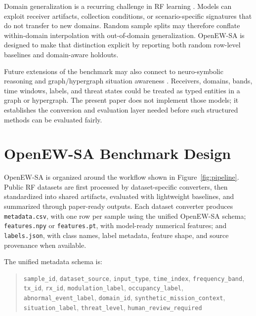 \documentclass[11pt]{article}
\newcommand{\artifact}[1]{\texttt{#1}}
\begin{document}
Domain generalization is a recurring challenge in RF learning \cite{zhang2025domainGeneralizationRff}. Models can exploit receiver artifacts, collection conditions, or scenario-specific signatures that do not transfer to new domains. Random sample splits may therefore conflate within-domain interpolation with out-of-domain generalization. OpenEW-SA is designed to make that distinction explicit by reporting both random row-level baselines and domain-aware holdouts.

Future extensions of the benchmark may also connect to neuro-symbolic reasoning \cite{cheng2024neuralSymbolicKgSurvey,liu2025neuralSymbolicQuerySurvey,delong2023neurosymbolicAiKgSurvey} and graph/hypergraph situation awareness \cite{gao2024hypergraphSituationAwareness,alavizadeh2022cyberSituationAwarenessSurvey}. Receivers, domains, bands, time windows, labels, and threat states could be treated as typed entities in a graph or hypergraph. The present paper does not implement those models; it establishes the conversion and evaluation layer needed before such structured methods can be evaluated fairly.

\section{OpenEW-SA Benchmark Design}

OpenEW-SA is organized around the workflow shown in Figure~\ref{fig:pipeline}. Public RF datasets are first processed by dataset-specific converters, then standardized into shared artifacts, evaluated with lightweight baselines, and summarized through paper-ready outputs. Each dataset converter produces \artifact{metadata.csv}, with one row per sample using the unified OpenEW-SA schema; \artifact{features.npy} or \artifact{features.pt}, with model-ready numerical features; and \artifact{labels.json}, with class names, label metadata, feature shape, and source provenance when available.

The unified metadata schema is:
\begin{quote}\small
\artifact{sample\_id}, \artifact{dataset\_source}, \artifact{input\_type}, \artifact{time\_index}, \artifact{frequency\_band}, \artifact{tx\_id}, \artifact{rx\_id}, \artifact{modulation\_label}, \artifact{occupancy\_label}, \artifact{abnormal\_event\_label}, \artifact{domain\_id}, \artifact{synthetic\_mission\_context}, \artifact{situation\_label}, \artifact{threat\_level}, \artifact{human\_review\_required}
\end{quote}
\end{document}
